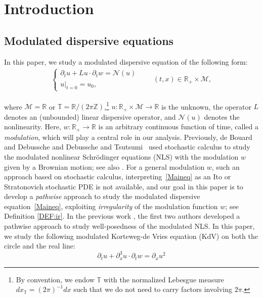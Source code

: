 \documentclass[letterpaper, 11pt,  reqno]{amsart}
\newcommand{\1}{\hspace{0.5mm}\text{I}\hspace{0.5mm}}
\newcommand{\noi}{\noindent}
\newcommand{\Z}{\mathbb{Z}}
\newcommand{\R}{\mathbb{R}}
\newcommand{\T}{\mathbb{T}}
\newcommand{\dx}{\partial_x}
\newcommand{\dt}{\partial_t}
\newcommand{\M}{\mathcal{M}}
\newcommand{\NN}{\mathcal{N}}
\numberwithin{equation}{section}
\numberwithin{theorem}{section}
\begin{document}
%
\maketitle
%


\tableofcontents









%
%
%


\newpage


\section{Introduction}\label{SEC:1}

\subsection{Modulated dispersive equations}
In this paper, we study  a modulated dispersive equation of the following form:
\begin{align}
\begin{cases}
\dt u +  L u \cdot \dt w=  \NN(u)  \\ 
u|_{t = 0} = u_0,
\end{cases}
\qquad ( t, x) \in \R_+ \times \M,
\label{Maineq}
\end{align}


\noi
where
$\M = \R$ or $  \T = \R/ (2\pi \Z)$,\footnote{By convention, we endow
$\T$ with the normalized Lebesgue measure $ dx_\T =  (2\pi)^{-1}dx$
such that we do not need to carry factors involving $2\pi$.}
 $u :\R_+\times \M \to \R$ is the unknown,
the operator  $L$ denotes  an (unbounded) linear dispersive operator, 
 and $\NN(u)$ denotes the nonlinearity.
Here, 
 $w:\R_+\to\R$ is an arbitrary continuous function of time, 
called a {\it modulation}, 
which will play a central role in our analysis.
Previously, 
de Bouard and Debussche \cite{DD} and Debussche and Tsutsumi~\cite{DT} 
used stochastic calculus to study 
the modulated nonlinear Schr\"odinger equations (NLS) with the modulation $w$ given by a Brownian motion;
see also \cite{DR2, Ste}.
For a general modulation $w$, 
such an approach based on stochastic calculus, 
interpreting~\eqref{Maineq}
as an Ito or Stratonovich stochastic PDE
is not available, and our goal in this paper is to develop a {\it pathwise} approach 
to study the modulated dispersive equation~\eqref{Maineq}, 
exploiting {\it irregularity} of the modulation function $w$;
see Definition \ref{DEF:ir}.
In the previous work
\cite{CG1}, the first two authors developed a pathwise
approach to study 
well-posedness of the modulated NLS. 
In this paper, we study
the following modulated 
 Korteweg-de Vries equation (KdV)
 on both the circle and the real line:
\begin{equation}
\label{kdv1}
\dt u+  \dx^3 u \cdot \dt w =\dx u^2
\end{equation}
\end{document}
